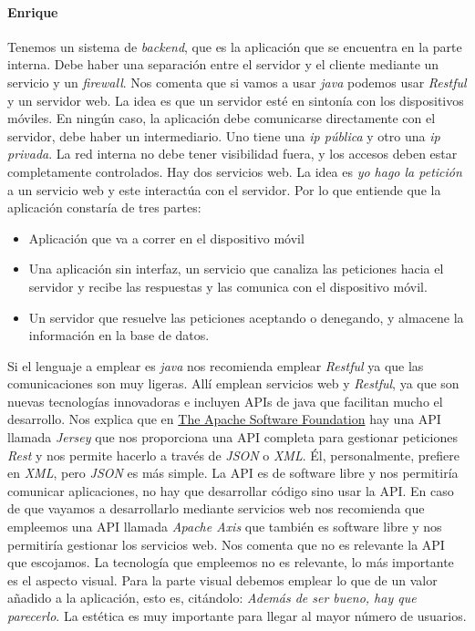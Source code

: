 \paragraph{Enrique} Tenemos un sistema de \textit{backend}, que es la aplicación que se encuentra en la parte interna. Debe haber una separación entre el servidor y el cliente mediante un servicio y un \textit{firewall}. Nos comenta que si vamos a usar \textit{java} podemos usar \textit{Restful} y un servidor web. La idea es que un servidor esté en sintonía con los dispositivos móviles. En ningún caso, la aplicación debe comunicarse directamente con el servidor, debe haber un intermediario. Uno tiene una \textit{ip pública} y otro una \textit{ip privada}. La red interna no debe tener visibilidad fuera, y los accesos deben estar completamente controlados. Hay dos servicios web. La idea es \textit{yo hago la petición} a un servicio web y este interactúa con el servidor. Por lo que  entiende que la aplicación constaría de tres partes:
\begin{itemize}
\item Aplicación que va a correr en el dispositivo móvil
\item Una aplicación sin interfaz, un servicio que canaliza las peticiones hacia el servidor y recibe las respuestas y las comunica con el dispositivo móvil.
\item Un servidor que resuelve las peticiones aceptando o denegando, y almacene la información en la base de datos.
\end{itemize}
Si el lenguaje a emplear es \textit{java} nos recomienda emplear \textit{Restful} ya que las comunicaciones son muy ligeras. Allí emplean servicios web y \textit{Restful}, ya que son nuevas tecnologías innovadoras e incluyen APIs de java que facilitan mucho el desarrollo. Nos explica que en \href{http://www.apache.org/}{The Apache Software Foundation} hay una API llamada \textit{Jersey} que nos proporciona una API completa para gestionar peticiones \textit{Rest} y nos permite hacerlo a través de \textit{JSON} o \textit{XML}. Él, personalmente, prefiere en \textit{XML}, pero \textit{JSON} es más simple. La API es de software libre y nos permitiría comunicar aplicaciones, no hay que desarrollar código sino usar la API. En caso de que vayamos a desarrollarlo mediante servicios web nos recomienda que empleemos una API llamada \textit{Apache Axis} que también es software libre y nos permitiría gestionar los servicios web. Nos comenta que no es relevante la API que escojamos. La tecnología que empleemos no es relevante, lo  más importante es el aspecto visual. Para la parte visual debemos emplear lo que de un valor añadido a la aplicación, esto es, citándolo: \textit{Además de ser bueno, hay que parecerlo}. La estética es muy importante para llegar al mayor número de usuarios.
 
